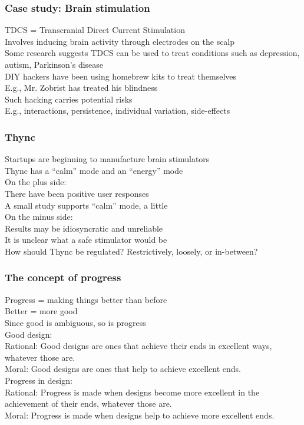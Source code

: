 \documentclass{article}
\begin{document}
\subsubsection*{Case study: Brain stimulation}
\label{ssub:case_study_brain_stimulation}
TDCS = Transcranial Direct Current Stimulation\\
Involves inducing brain activity through electrodes on the scalp\\
Some research suggests TDCS can be used to treat conditions such as depression, autism, Parkinson’s disease\\
DIY hackers have been using homebrew kits to treat themselves\\
E.g., Mr. Zobrist has treated his blindness\\
Such hacking carries potential risks\\
E.g., interactions, persistence, individual variation, side-effects\\
\subsubsection*{Thync}
\label{ssub:thync}
Startups are beginning to manufacture brain stimulators\\
Thync has a “calm” mode and an “energy” mode\\
On the plus side:\\
There have been positive user responses\\
A small study supports “calm” mode, a little\\
On the minus side:\\
Results may be idiosyncratic and unreliable\\
It is unclear what a safe stimulator would be\\
How should Thync be regulated? Restrictively, loosely, or in-between?\\
\subsubsection*{The concept of progress}
\label{ssub:the_concept_of_progress}
Progress = making things better than before\\
Better = more good\\
Since good is ambiguous, so is progress\\
Good design:\\
Rational: Good designs are ones that achieve their ends in excellent ways, whatever those are.\\
Moral: Good designs are ones that help to achieve excellent ends.\\
Progress in design:\\
Rational: Progress is made when designs become more excellent in the achievement of their ends, whatever those are.\\
Moral: Progress is made when designs help to achieve more excellent ends.\\
\end{document}
